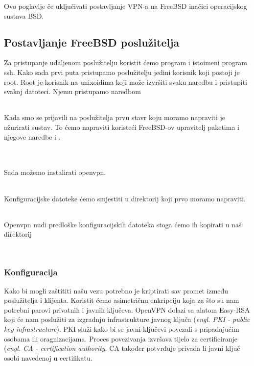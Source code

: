 Ovo poglavlje če uključivati postavljanje VPN-a na FreeBSD inačici operacijskog
sustava BSD. 

\subsection{Postavljanje FreeBSD poslužitelja}
    Za pristupanje udaljenom poslužitelju koristit ćemo program i istoimeni
    program ssh. Kako sada prvi puta pristupamo poslužitelju jedini korisnik
    koji postoji je root. Root je korisnik na unixoidima koji može izvršiti
    svaku naredbu i pristupiti svakoj datoteci. Njemu pristupamo naredbom
    
     \\

    Kada smo se prijavili na poslužitelja prvu stavr koju moramo napraviti je
    ažurirati sustav. To ćemo napraviti koristeći FreeBSD-ov upravitelj
    paketima  i njegove naredbe  i .

     \\
     \\

    Sada možemo instalirati openvpn.

     \\

    Konfiguracijske datoteke ćemo smjestiti u direktorij
     koji prvo moramo napraviti.

     \\

    Openvpn nudi predloške konfiguracijskih datoteka stoga ćemo ih kopirati u
    naš direktorij

    \noindent
     \\

    \subsubsection{Konfiguracija}
        Kako bi mogli zaštititi našu vezu potrebno je kriptirati sav promet
        između poslužitelja i klijenta. Koristit ćemo asimetričnu enkripciju
        koja za što su nam potrebni parovi privatnih i javnih ključeva. OpenVPN
        dolazi sa alatom Easy-RSA koji će nam poslužiti za izgradnju
        infrastrukture javnog ključa (\textit{engl. PKI - public key
        infrastructure}). PKI služi kako bi se javni ključevi povezali s
        pripadajućim osobama ili oragnizacijama. Proces povezivanja izvršava
        tijelo za certificiranje (\textit{engl. CA - certification authority}.
        CA također potvrđuje privada li javni ključ osobi navedenoj u
        certifikatu.

